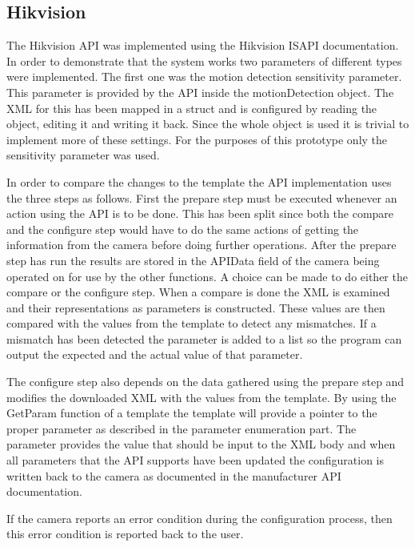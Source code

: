\subsection{Hikvision}
The Hikvision API was implemented using the Hikvision ISAPI documentation\cite{hikvision_intelligent_nodate}.
In order to demonstrate that the system works two parameters of different types were implemented.
The first one was the motion detection sensitivity parameter.
This parameter is provided by the API inside the motionDetection object.
The XML for this has been mapped in a struct and is configured by reading the object, editing it and writing it back.
Since the whole object is used it is trivial to implement more of these settings.
For the purposes of this prototype only the sensitivity parameter was used.


In order to compare the changes to the template the API implementation uses the three steps as follows.
First the prepare step must be executed whenever an action using the API is to be done.
This has been split since both the compare and the configure step would have to do the same actions of getting the information from the camera before doing further operations.
After the prepare step has run the results are stored in the APIData field of the camera being operated on for use by the other functions.
A choice can be made to do either the compare or the configure step.
When a compare is done the XML is examined and their representations as parameters is constructed.
These values are then compared with the values from the template to detect any mismatches.
If a mismatch has been detected the parameter is added to a list so the program can output the expected and the actual value of that parameter.

The configure step also depends on the data gathered using the prepare step and modifies the downloaded XML with the values from the template.
By using the GetParam function of a template the template will provide a pointer to the proper parameter as described in the parameter enumeration part.
The parameter provides the value that should be input to the XML body and when all parameters that the API supports have been updated the configuration is written back to the camera as documented in the manufacturer API documentation.

If the camera reports an error condition during the configuration process, then this error condition is reported back to the user.

